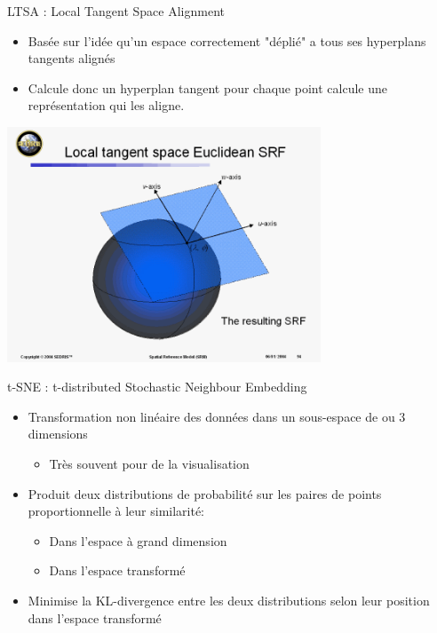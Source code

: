 \documentclass[french]{beamer}
\begin{document}
\begin{frame}{LTSA : Local Tangent Space Alignment}
\begin{itemize}
	\item Basée sur l'idée qu'un espace correctement "déplié" a tous ses hyperplans tangents alignés
	\item Calcule donc un hyperplan tangent pour chaque point calcule une représentation qui les aligne.
\end{itemize}
\begin{center}
	\includegraphics[width=0.7\textwidth]{ltsa}
\end{center}
\end{frame}

\begin{frame}{t-SNE : t-distributed Stochastic Neighbour Embedding}
\begin{itemize}
	\item Transformation non linéaire des données dans un sous-espace de ou 3 dimensions
	\begin{itemize}
		\item Très souvent pour de la visualisation
	\end{itemize}
	\item Produit deux distributions de probabilité sur les paires de points proportionnelle à leur similarité:
	\begin{itemize}
		\item Dans l'espace à grand dimension
		\item Dans l'espace transformé
	\end{itemize}
	\item Minimise la KL-divergence entre les deux distributions selon leur position dans l'espace transformé
\end{itemize}
\end{frame}
\end{document}
